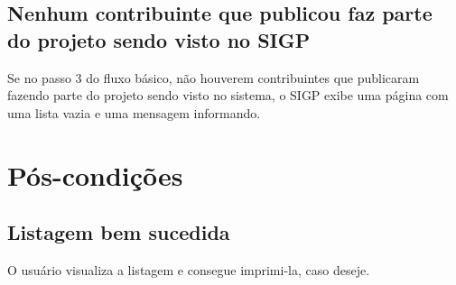 \documentclass[11pt, a4paper,oneside]{book}
\begin{document}
\subsection{Nenhum contribuinte que publicou faz parte do projeto sendo visto no SIGP}
Se no passo $3$ do fluxo básico, não houverem contribuintes que publicaram fazendo parte do projeto sendo visto no sistema, o SIGP exibe uma página com uma lista vazia e uma mensagem informando.

%
%
%
%

\section{Pós-condições}

\subsection{Listagem bem sucedida}

O usuário visualiza a listagem e consegue imprimi-la, caso deseje.

%
\end{document}
